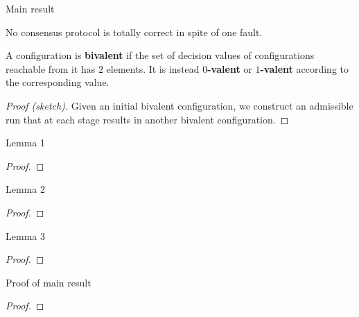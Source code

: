 \documentclass[12pt]{beamer}
\begin{document}
  \begin{frame}{Main result}
    \begin{theorem}
      No consensus protocol is totally correct in spite of one fault.
    \end{theorem}

    \vspace{0.25cm}

    A configuration is \textbf{bivalent} if the set of decision values of configurations reachable from it has \(2\) elements. It is instead \textbf{\(0\)-valent} or \textbf{\(1\)-valent} according to the corresponding value.

    \vspace{0.25cm}

    \begin{proof}[Proof (sketch)]
      Given an initial bivalent configuration, we construct an admissible run that at each stage results in another bivalent configuration.
    \end{proof}
  \end{frame}

  \begin{frame}{Lemma 1}
    \begin{lemma}
    \end{lemma}
    \begin{proof}
    \end{proof}
  \end{frame}

  \begin{frame}{Lemma 2}
    \begin{lemma}
    \end{lemma}
    \begin{proof}
    \end{proof}
  \end{frame}

  \begin{frame}{Lemma 3}
    \begin{lemma}
    \end{lemma}
    \begin{proof}
    \end{proof}
  \end{frame}

  \begin{frame}{Proof of main result}
    \begin{proof}
    \end{proof}
  \end{frame}
\end{document}
